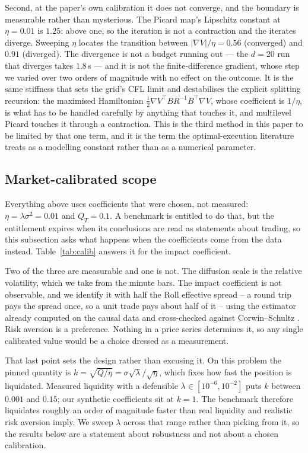 \documentclass[conference]{IEEEtran}
\begin{document}
Second, at the paper's own calibration it does not converge, and the boundary is measurable rather than
mysterious. The Picard map's Lipschitz constant at $\eta = 0.01$ is $1.25$: above one, so the iteration
is not a contraction and the iterates diverge. Sweeping $\eta$ locates the transition between
$|\nabla V|/\eta = 0.56$ (converged) and $0.91$ (diverged). The divergence is not a budget running out
--- the $d=20$ run that diverges takes $1.8$\,s --- and it is not the finite-difference gradient, whose
step we varied over two orders of magnitude with no effect on the outcome. It is the same stiffness
that sets the grid's CFL limit and destabilises the explicit splitting recursion: the maximised
Hamiltonian $\tfrac12\nabla V^\top BR^{-1}B^\top\nabla V$, whose coefficient is $1/\eta$, is what has
to be handled carefully by anything that touches it, and multilevel Picard touches it through a
contraction. This is the third method in this paper to be limited by that one term, and it is the term
the optimal-execution literature treats as a modelling constant rather than as a numerical parameter.

\subsection{Market-calibrated scope}\label{sec:calib}



Everything above uses coefficients that were chosen, not measured: $\eta = \lambda\sigma^2 = 0.01$ and
$Q_T = 0.1$. A benchmark is entitled to do that, but the entitlement expires when its conclusions are
read as statements about trading, so this subsection asks what happens when the coefficients come
from the data instead. Table~\ref{tab:calib} answers it for the impact coefficient.

Two of the three are measurable and one is not. The diffusion scale is the relative volatility, which
we take from the minute bars. The impact coefficient is not observable, and we identify it with half
the Roll effective spread \cite{roll1984simple} -- a round trip pays the spread once, so a unit trade
pays about half of it -- using the estimator already computed on the causal data and cross-checked
against Corwin--Schultz \cite{corwin2012simple}. Risk aversion is a preference. Nothing in a price
series determines it, so any single calibrated value would be a choice dressed as a measurement.

That last point sets the design rather than excusing it. On this problem the pinned quantity is
$k = \sqrt{Q/\eta} = \sigma\sqrt{\lambda}/\sqrt{\eta}$, which fixes how fast the position is
liquidated. Measured liquidity with a defensible $\lambda \in [10^{-6}, 10^{-2}]$ puts $k$ between
$0.001$ and $0.15$; our synthetic coefficients sit at $k = 1$. The benchmark therefore liquidates
roughly an order of magnitude faster than real liquidity and realistic risk aversion imply. We
sweep $\lambda$ across that range rather than picking from it, so the results below are a statement
about robustness and not about a chosen calibration.
\end{document}
